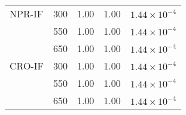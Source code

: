\begin{table}[ht]
\begin{tabular}{p{2cm}<{\centering}p{2cm}<{\centering}p{3.5cm}<{\centering}p{3.5cm}<{\centering}p{2cm}<{\centering}}
    \midrule
    NPR-IF  & 300   & 1.00  & 1.00  & $1.44\times 10^{-4}$ \\
          & 550   & 1.00  & 1.00  & $1.44\times 10^{-4}$ \\
          & 650   & 1.00  & 1.00  & $1.44\times 10^{-4}$ \\
    \midrule
    CRO-IF  & 300   & 1.00  & 1.00  & $1.44\times 10^{-4}$ \\
          & 550   & 1.00  & 1.00  & $1.44\times 10^{-4}$ \\
          & 650   & 1.00  & 1.00  & $1.44\times 10^{-4}$ \\
    \bottomrule
    \end{tabular}%
  \label{tab:Loading-Conditions}%
\end{table}%

